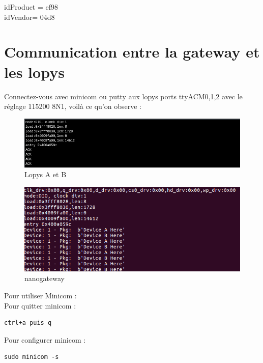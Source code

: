 \documentclass{article}
\begin{document}
idProduct = ef98\\
idVendor= 04d8\\







\section{Communication entre la gateway et les lopys}

Connectez-vous avec minicom ou putty aux lopys ports ttyACM0,1,2 avec le réglage 115200 8N1, voilà ce qu'on observe : \\

 \begin{figure}[H]
\begin{center}
\advance\leftskip-3cm
\advance\rightskip-3cm
\includegraphics[keepaspectratio=true,scale=0.5]{gatewayloramac_ack.png}
\caption{Lopys A et B}
\label{visina8}
\end{center}\end{figure}



 \begin{figure}[H]
\begin{center}
\advance\leftskip-3cm
\advance\rightskip-3cm
\includegraphics[keepaspectratio=true,scale=0.5]{gateway_loramac_deviceABhere.png}
\caption{nanogateway}
\label{visina8}
\end{center}\end{figure}

Pour utiliser Minicom : \\
Pour quitter minicom :
\begin{verbatim}
ctrl+a puis q

\end{verbatim}
Pour configurer minicom : 
\begin{verbatim}
sudo minicom -s

\end{verbatim}
\end{document}
